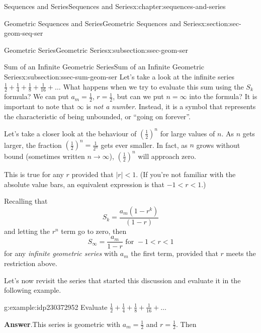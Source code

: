 \documentclass[twoside,10pt,]{book}
\newcommand{\blocktitlefont}{\relax}
\numberwithin{equation}{section}
\newcommand{\lt}{<}
\begin{document}
\begin{chapterptx}{Sequences and Series}{}{Sequences and Series}{}{}{x:chapter:sequences-and-series}
\begin{sectionptx}{Geometric Sequences and Series}{}{Geometric Sequences and Series}{}{}{x:section:sec-geom-seq-ser}
\begin{subsectionptx}{Geometric Series}{}{Geometric Series}{}{}{x:subsection:ssec-geom-ser}
%
\end{subsectionptx}
%
%
\typeout{************************************************}
\typeout{************************************************}
%
\begin{subsectionptx}{Sum of an Infinite Geometric Series}{}{Sum of an Infinite Geometric Series}{}{}{x:subsection:ssec-sum-geom-ser}
Let's take a look at the infinite series \(\frac{1}{2} + \frac{1}{4} + \frac{1}{8} + \frac{1}{{16}} + \ldots\) What happens when we try to evaluate this sum using the \(S_k\) formula?  We can put \(a_m = \frac{1}{2}\), \(r = \frac{1}{2}\), but can we put \(n = \infty\) into the formula?  It is important to note that \(\infty\) is \emph{not a number}.  Instead, it is a symbol that represents the characteristic of being unbounded, or ``going on forever''.%
\par
Let's take a closer look at the behaviour of \((\frac{1}{2})^n\) for large values of \(n\).  As \(n\) gets larger, the fraction \({\left( {\frac{1}{2}} \right)^n} = \frac{1}{{{2^n}}}\) gets ever smaller.  In fact, as \(n\) grows without bound (sometimes written \(n\to\infty\)), \((\frac{1}{2})^n \) will approach zero.%
\par
This is true for any \(r\) provided that \(|r| \lt 1\).  (If you're not familiar with the absolute value bars, an equivalent expression is that \(-1 \lt r \lt 1\).)%
\par
Recalling that%
\begin{equation*}
{S_k} = \frac{{{a_m}\left( {1 - {r^k}} \right)}}{{\left( {1 - r} \right)}}
\end{equation*}
and letting the \(r^n\) term go to zero, then%
\begin{equation*}
{S_\infty } = \frac{{{a_m}}}{{1 - r}} \text{ for } -1 \lt r \lt 1
\end{equation*}
for any \emph{infinite geometric series} with \(a_m\) the first term, provided that \(r\) meets the restriction above.%
\par
Let's now revisit the series that started this discussion and evaluate it in the following example. \begin{example}{}{g:example:idp230372952}%
Evaluate \(\frac{1}{2} + \frac{1}{4} + \frac{1}{8} + \frac{1}{{16}} +\ldots\)\par\smallskip%
\noindent\textbf{\blocktitlefont Answer}.\label{g:answer:idp230367832}{}\hypertarget{g:answer:idp230367832}{}\quad{}This series is geometric with \(a_m = \frac{1}{2}\) and \(r = \frac{1}{2}\).  Then%

\end{example}
\end{subsectionptx}
\end{sectionptx}
\end{chapterptx}
\end{document}
